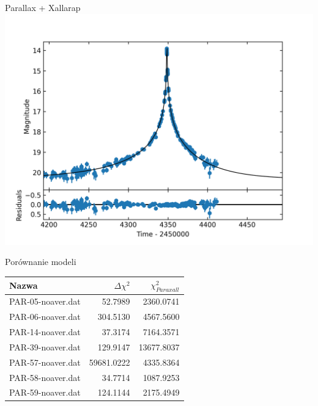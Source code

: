 \documentclass{beamer}
\begin{document}
\begin{frame}
\begin{columns}
\begin{column}{0.45\linewidth}
        \end{column}
    \end{columns}
    Parallax + Xallarap\\
    \includegraphics[width = 0.45\linewidth]{../sim30/paraxall/png/PAR-57-noaver.dat+.png}
\end{frame}

\begin{frame}{Porównanie modeli}
    \begin{table}[h]
        \centering
        \begin{tabular}{l r r}
            \toprule
            Nazwa             & $\Delta\chi^2$ & $\chi^2 _{Paraxall}$ \\
            \midrule
            PAR-05-noaver.dat & 52.7989        & 2360.0741            \\
            PAR-06-noaver.dat & 304.5130       & 4567.5600            \\
            PAR-14-noaver.dat & 37.3174        & 7164.3571            \\
            PAR-39-noaver.dat & 129.9147       & 13677.8037           \\
            PAR-57-noaver.dat & 59681.0222     & 4335.8364            \\
            PAR-58-noaver.dat & 34.7714        & 1087.9253            \\
            PAR-59-noaver.dat & 124.1144       & 2175.4949            \\
            \bottomrule
        \end{tabular}
    \end{table}

\end{frame}
\end{document}
